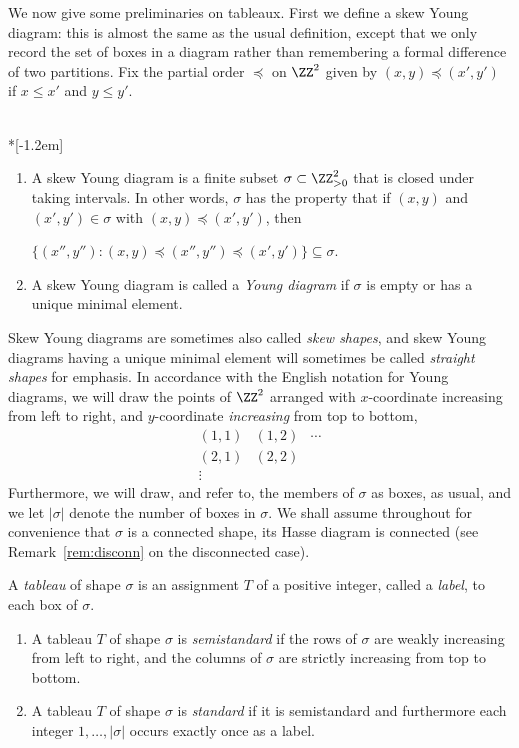 We now give some preliminaries on tableaux. First we define a skew Young diagram: this is almost the same as the usual definition, except that we only record the set of boxes in a diagram rather than remembering a formal difference of two partitions.
Fix the partial order $\preceq$ on $\ZZ^2$ given by $(x,y)\preceq (x',y')$ if $x\le x'$ and $y\le y'$. 

\begin{defi}\label{def:young}\ \\*[-1.2em]
\begin{enumerate}
\item\label{defi2.1_1} 
A skew Young diagram is a finite subset $\sigma \subset \ZZ_{>0}^2$ that is closed under taking intervals. In other words, $\sigma$ has the property that if $(x,y)$ and $(x',y')\in \sigma$ with $(x,y)\preceq (x',y')$, then 
\begin{center}
$\{(x'',y''):(x,y)\preceq (x'',y'') \preceq (x',y')\}\subseteq \sigma.$
\end{center}
\item\label{defi2.1_2} A skew Young diagram is called a \emph{Young diagram} if $\sigma$ is empty or has a unique minimal element.
\end{enumerate}
\end{defi}

Skew Young diagrams are sometimes also called \emph{skew shapes}, and skew Young diagrams having a unique minimal element will sometimes be called \emph{straight shapes} for emphasis. 
In accordance with the English notation for Young diagrams, we will draw the points of $\ZZ^2$ arranged with $x$-coordinate increasing from left to right, and $y$-coordinate \emph{increasing} from top to bottom, \eg
\[
\begin{array}{ccc}
(1,1) & (1,2) & \cdots \\
(2,1) & (2,2) & \\
\vdots & &
\end{array}
\]
Furthermore, we will draw, and refer to, the members of $\sigma$ as boxes, as usual, and we let $|\sigma|$ denote the number of boxes in $\sigma$. We shall assume throughout for convenience that $\sigma$ is a connected shape, \ie its Hasse diagram is connected (see Remark~\ref{rem:disconn} on the disconnected case). 

\begin{defi} \label{def:tableau}
A \emph{tableau} of shape $\sigma$ is an assignment $T$ of a positive integer, called a \emph{label}, to each box of $\sigma$. \begin{enumerate}
\item\label{defi2.2_1} A tableau $T$ of shape $\sigma$ is \emph{semistandard} if the rows of $\sigma$ are weakly increasing from left to right, and the columns of $\sigma$ are strictly increasing from top to bottom.
\item\label{defi2.2_2} A tableau $T$ of shape $\sigma$ is \emph{standard} if it is semistandard and furthermore each integer $1,\ldots,|\sigma|$ occurs exactly once as a label.
\end{enumerate}

\end{defi}

